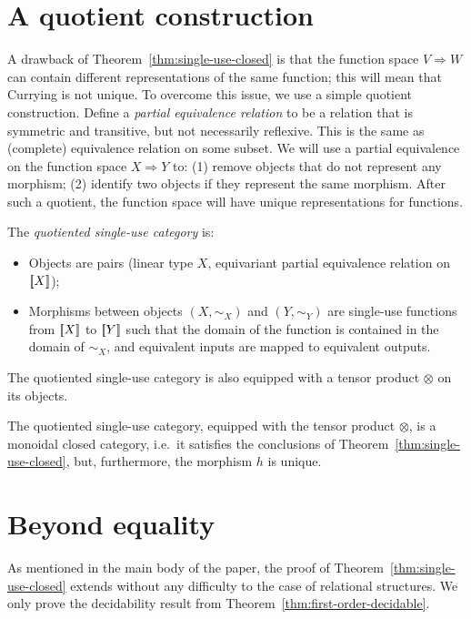 \documentclass[10pt,a4paper]{amsart}
\numberwithin{equation}{section}
\theoremstyle{plain}
\newcommand{\sem}[1]{[{\kern-0.45ex}[#1]{\kern-0.45ex}]}
\newcommand{\funspace}[2]{#1 \Rightarrow #2}
\begin{document}
\section{A quotient construction}
\label{sec:quotient-category}
A drawback of Theorem~\ref{thm:single-use-closed} is that the function space $\funspace V W$ can contain different representations of the same function; this will mean that Currying is not unique. To overcome this issue, we use a simple quotient construction. 
Define a \emph{partial equivalence relation} to be a relation that is symmetric and transitive, but not necessarily reflexive.  This is the same as (complete) equivalence relation on some subset. We will use a partial equivalence on the function space $X \Rightarrow Y$ to: (1)
 remove objects that do not represent any morphism; (2) identify two objects if they represent the same morphism. After such a quotient, the function space will have unique representations for functions. 




\begin{definition}
    The \emph{quotiented single-use category} is: 
    \begin{itemize}
    \item Objects are pairs (linear type $X$, equivariant partial equivalence relation on $\sem X$);
    \item Morphisms between objects $(X,\sim_X)$ and $(Y,\sim_Y)$ are single-use functions from $\sem X$ to $\sem Y$ such that the domain of the function is contained in the domain of $\sim_X$, and equivalent inputs are mapped to equivalent outputs.
    \end{itemize}
\end{definition}

The quotiented single-use category is also equipped with a tensor product $\otimes$ on its objects.
\begin{theorem}
    The quotiented single-use category, equipped with the tensor product $\otimes$, is a monoidal closed category, i.e.~it satisfies the conclusions of Theorem~\ref{thm:single-use-closed}, but, furthermore, the morphism $h$ is unique.
\end{theorem}


\section{Beyond equality}
\label{sec:beyond-equality-appendix}

As mentioned in the main body of the paper, the proof of Theorem~\ref{thm:single-use-closed} extends without any difficulty to the case of relational structures. We only prove the decidability result from Theorem~\ref{thm:first-order-decidable}.
\end{document}
